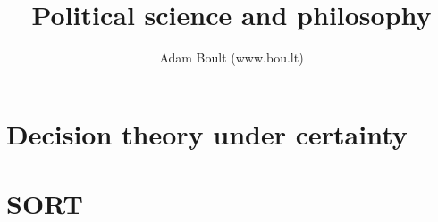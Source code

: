 \documentclass[oneside]{book}
\begin{document}
\author{Adam Boult (www.bou.lt)}
\title{Political science and philosophy}
\maketitle

\setcounter{tocdepth}{0}
\tableofcontents



\part{Decision theory under certainty}


\part{SORT}

\end{document}
